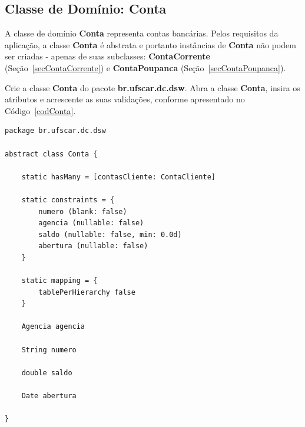 \newpage

\subsection{Classe de Domínio: Conta}\label{secConta}

\vspace{0.5cm}

A classe de domínio {\bf Conta} representa contas bancárias. Pelos requisitos da
aplicação, a classe {\bf Conta} é  abstrata e portanto instâncias de {\bf Conta}
não  podem  ser  criadas  -  apenas  de  suas  subclasses:  {\bf  ContaCorrente}
(Seção~\ref{secContaCorrente})           e          {\bf          ContaPoupanca}
(Seção~\ref{secContaPoupanca}). 

\vspace{0.2cm}

Crie a classe {\bf Conta} do  pacote {\bf br.ufscar.dc.dsw}.  Abra a classe {\bf
  Conta},  insira  os  atributos  e  acrescente  as  suas  validações,  conforme
apresentado no Código~\ref{codConta}.  

\begin{lstlisting}[caption=Classe  de   domínio  {\bf  Conta},   frame  =  trBL,
    float=htbp, label=codConta] 
package br.ufscar.dc.dsw

abstract class Conta {

    static hasMany = [contasCliente: ContaCliente]
    
    static constraints = {
        numero (blank: false)
        agencia (nullable: false)
        saldo (nullable: false, min: 0.0d)
        abertura (nullable: false)
    }
	
    static mapping = {
        tablePerHierarchy false
    }
        
    Agencia agencia
    
    String numero
	
    double saldo
	
    Date abertura
	
}
\end{lstlisting}

\hspace{1cm}\\
\hspace{1cm}\\

